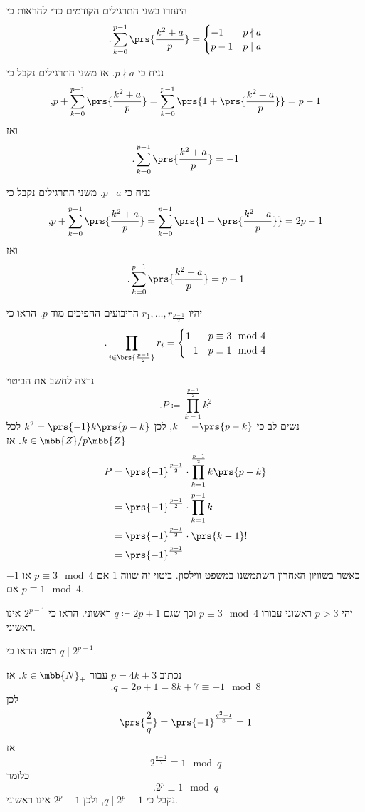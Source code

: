 \documentclass[a4paper,10pt,twoside,openany]{book}
\begin{document}
\begin{exercisechap}
היעזרו בשני התרגילים הקודמים כדי להראות כי
\[\text{.} \sum_{k=0}^{p-1} \prs{\frac{k^2 + a}{p}} = \begin{cases}
-1 & p \nmid a \\
p-1 & p \mid a
\end{cases}\]
\end{exercisechap}

\begin{solution}
נניח כי
$p \nmid a$.
אז משני התרגילים נקבל כי
\[\text{,} p + \sum_{k=0}^{p-1} \prs{\frac{k^2 + a}{p}} = \sum_{k=0}^{p-1} \prs{1 + \prs{\frac{k^2 + a}{p}}} = p-1\]
ואז
\[\text{.} \sum_{k=0}^{p-1} \prs{\frac{k^2 + a}{p}} = -1\]

נניח כי
$p \mid a$.
משני התרגילים נקבל כי
\[\text{,} p + \sum_{k=0}^{p-1} \prs{\frac{k^2 + a}{p}} = \sum_{k=0}^{p-1} \prs{1 + \prs{\frac{k^2 + a}{p}}} = 2p-1\]
ואז
\[\text{.} \sum_{k=0}^{p-1} \prs{\frac{k^2 + a}{p}} = p-1\]
\end{solution}

\begin{exercisechap}
יהיו
$r_1, \ldots, r_{\frac{p-1}{2}}$
הריבועים ההפיכים מוד
$p$.
הראו כי
\[
\text{.} \prod_{i \in \brs{\frac{p-1}{2}}} r_i = \begin{cases}
1 & p \equiv 3 \mod{4} \\
-1 & p \equiv 1 \mod{4}
\end{cases}
\]
\end{exercisechap}

\begin{solution}
נרצה לחשב את הביטוי
\[\text{.} P \coloneqq \prod_{k = 1}^{\frac{p-1}{2}} k^2\]
נשים לב כי
$k = -\prs{p-k}$,
לכן
$k^2 = \prs{-1} k \prs{p-k}$
לכל
$k \in \mbb{Z}/p\mbb{Z}$.
אז
\begin{align*}
P &= \prs{-1}^{\frac{p-1}{2}} \cdot \prod_{k = 1}^{\frac{p-1}{2}} k \prs{p-k}
\\&= \prs{-1}^{\frac{p-1}{2}} \cdot \prod_{k=1}^{p-1} k
\\&= \prs{-1}^{\frac{p-1}{2}} \cdot \prs{k-1}!
\\&= \prs{-1}^{\frac{p+1}{2}}
\end{align*}
כאשר בשוויון האחרון השתמשנו במשפט ווילסון.
ביטוי זה שווה
$1$
אם
$p \equiv 3 \mod{4}$
או
$-1$
אם
$p \equiv 1 \mod{4}$.
\end{solution}

\begin{exercisechap}
יהי
$p > 3$
ראשוני עבורו
$p \equiv 3 \mod{4}$
וכך שגם
$q \coloneqq 2p + 1$
ראשוני.
הראו כי
$2^{p-1}$
אינו ראשוני.

\textbf{רמז:}
הראו כי
$q \mid 2^{p-1}$.
\end{exercisechap}

\begin{solution}
נכתוב
$p = 4k + 3$
עבור
$k \in \mbb{N}_+$.
אז
\[\text{.} q = 2p+1 = 8k + 7 \equiv -1 \mod{8}\]
לכן
\[\prs{\frac{2}{q}} = \prs{-1}^{\frac{q^2 - 1}{8}} = 1\]
אז
\[2^{\frac{q-1}{2}} \equiv 1 \mod{q}\]
כלומר
\[\text{.} 2^p \equiv 1 \mod{q}\]
נקבל כי
$q \mid 2^p - 1$,
ולכן
$2^p - 1$
אינו ראשוני.
\end{solution}


\printbibliography
\end{document}
